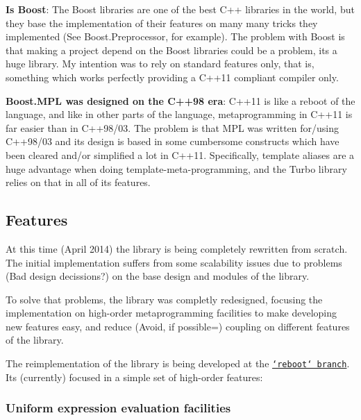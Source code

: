 \begin{DoxyItemize}
\item {\bfseries Is Boost}\+: The Boost libraries are one of the best C++ libraries in the world, but they base the implementation of their features on many many tricks they implemented (See Boost.\+Preprocessor, for example). The problem with Boost is that making a project depend on the Boost libraries could be a problem, its a huge library. My intention was to rely on standard features only, that is, something which works perfectly providing a C++11 compliant compiler only.
\item {\bfseries Boost.\+M\+P\+L was designed on the C++98 era}\+: C++11 is like a reboot of the language, and like in other parts of the language, metaprogramming in C++11 is far easier than in C++98/03. The problem is that M\+P\+L was written for/using C++98/03 and its design is based in some cumbersome constructs which have been cleared and/or simplified a lot in C++11. Specifically, template aliases are a huge advantage when doing template-\/meta-\/programming, and the Turbo library relies on that in all of its features.
\end{DoxyItemize}

\subsection*{Features}

At this time (April 2014) the library is being completely rewritten from scratch. The initial implementation suffers from some scalability issues due to problems (Bad design decissions?) on the base design and modules of the library.

To solve that problems, the library was completly redesigned, focusing the implementation on high-\/order metaprogramming facilities to make developing new features easy, and reduce (Avoid, if possible=) coupling on different features of the library.

The reimplementation of the library is being developed at the \href{https://github.com/Manu343726/Turbo/tree/reboot}{\tt `reboot` branch}. Its (currently) focused in a simple set of high-\/order features\+:

\subsubsection*{Uniform expression evaluation facilities}

